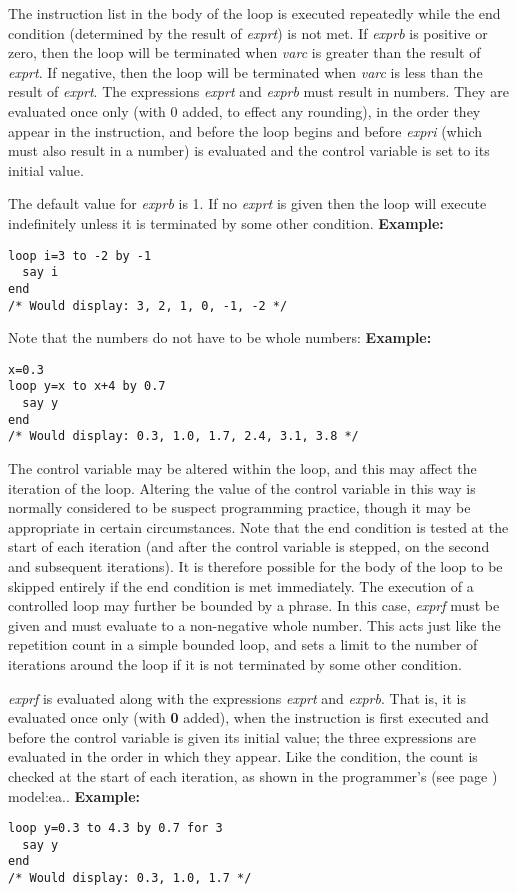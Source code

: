 \begin{description}
The instruction list in the body of the loop is executed repeatedly
while the end condition (determined by the result of \emph{exprt})
is not met.
If \emph{exprb} is positive or zero, then the loop will be
terminated when \emph{varc} is greater than the result of
\emph{exprt}.
If negative, then the loop will be terminated when \emph{varc} is
less than the result of \emph{exprt}.
 The expressions \emph{exprt} and \emph{exprb} must result in
numbers.
They are evaluated once only (with 0 added, to effect any
rounding), in the order they appear in the instruction, and before the
loop begins and before \emph{expri} (which must also result in a
number) is evaluated and the control variable is set to its initial
value.
 
The default value for \emph{exprb} is 1.
If no \emph{exprt} is given then the loop will execute indefinitely
unless it is terminated by some other condition.
 \textbf{Example:}
\begin{lstlisting}
loop i=3 to -2 by -1
  say i
end
/* Would display: 3, 2, 1, 0, -1, -2 */
\end{lstlisting}
Note that the numbers do not have to be whole numbers:
 \textbf{Example:}
\begin{lstlisting}
x=0.3
loop y=x to x+4 by 0.7
  say y
end
/* Would display: 0.3, 1.0, 1.7, 2.4, 3.1, 3.8 */
\end{lstlisting}
 The control variable may be altered within the loop, and this may
affect the iteration of the loop.
Altering the value of the control variable in this way is normally
considered to be suspect programming practice, though it may be
appropriate in certain circumstances.
 Note that the end condition is tested at the start of each iteration
(and after the control variable is stepped, on the second and
subsequent iterations).  It is therefore possible for the body of the
loop to be skipped entirely if the end condition is met immediately.
 The execution of a controlled loop may further be bounded by a
 phrase.
In this case, \emph{exprf} must be given and must evaluate to a
non-negative whole number.
This acts just like the repetition count in a simple bounded loop, and
sets a limit to the number of iterations around the loop if it is not
terminated by some other condition.
 
\emph{exprf} is evaluated along with the expressions
\emph{exprt} and \emph{exprb}.
That is, it is evaluated once only (with \textbf{0} added), when the
 instruction is first executed and before the control
variable is given its initial value; the three expressions are evaluated
in the order in which they appear.
Like the  condition, the  count is checked at the
start of each iteration, as shown in the  programmer's (see page \pageref{refloopmod}) 
model:ea..
 \textbf{Example:}
\begin{lstlisting}
loop y=0.3 to 4.3 by 0.7 for 3
  say y
end
/* Would display: 0.3, 1.0, 1.7 */
\end{lstlisting}
 

\end{description}
